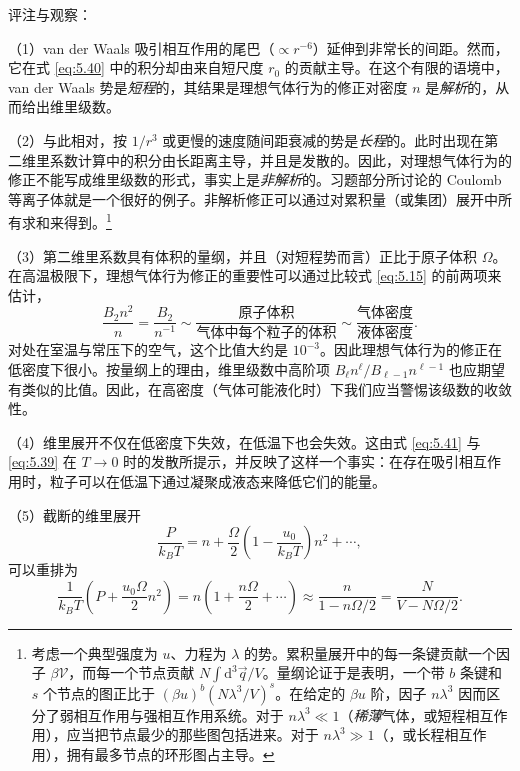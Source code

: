
评注与观察：

（1）van der Waals 吸引相互作用的尾巴（$\propto r^{-6}$）延伸到非常长的间距。然而，它在式 \eqref{eq:5.40} 中的积分却由来自短尺度 $r_0$ 的贡献主导。在这个有限的语境中，van der Waals 势是\emph{短程}的，其结果是理想气体行为的修正对密度 $n$ 是\emph{解析}的，从而给出维里级数。

（2）与此相对，按 $1/r^3$ 或更慢的速度随间距衰减的势是\emph{长程}的。此时出现在第二维里系数计算中的积分由长距离主导，并且是发散的。因此，对理想气体行为的修正不能写成维里级数的形式，事实上是\emph{非解析}的。习题部分所讨论的 Coulomb 等离子体就是一个很好的例子。非解析修正可以通过对累积量（或集团）展开中所有求和来得到。\footnote{考虑一个典型强度为 $u$、力程为 $\lambda$ 的势。累积量展开中的每一条键贡献一个因子 $\beta\mathscr V$，而每一个节点贡献 $N\int\mathrm{d}^3\vec q/V$。量纲论证于是表明，一个带 $b$ 条键和 $s$ 个节点的图正比于 $(\beta u)^b(N\lambda^3/V)^s$。在给定的 $\beta u$ 阶，因子 $n\lambda^3$ 因而区分了弱相互作用与强相互作用系统。对于 $n\lambda^3\ll1$（\emph{稀薄}气体，或短程相互作用），应当把节点最少的那些图包括进来。对于 $n\lambda^3\gg1$（，或长程相互作用），拥有最多节点的环形图占主导。}

（3）第二维里系数具有体积的量纲，并且（对短程势而言）正比于原子体积 $\Omega$。在高温极限下，理想气体行为修正的重要性可以通过比较式 \eqref{eq:5.15} 的前两项来估计，
\begin{equation}\label{eq:5.42}
\frac{B_2n^2}{n}=\frac{B_2}{n^{-1}}\sim\frac{\text{原子体积}}{\text{气体中每个粒子的体积}}\sim\frac{\text{气体密度}}{\text{液体密度}}.
\end{equation}
对处在室温与常压下的空气，这个比值大约是 $10^{-3}$。因此理想气体行为的修正在低密度下很小。按量纲上的理由，维里级数中高阶项 $B_\ell n^\ell/B_{\ell-1}n^{\ell-1}$ 也应期望有类似的比值。因此，在高密度（气体可能液化时）下我们应当警惕该级数的收敛性。

（4）维里展开不仅在低密度下失效，在低温下也会失效。这由式 \eqref{eq:5.41} 与 \eqref{eq:5.39} 在 $T\to0$ 时的发散所提示，并反映了这样一个事实：在存在吸引相互作用时，粒子可以在低温下通过凝聚成液态来降低它们的能量。

（5）截断的维里展开
\begin{equation}\label{eq:5.43}
\frac{P}{k_BT}=n+\frac{\Omega}{2}\left(1-\frac{u_0}{k_BT}\right)n^2+\cdots,
\end{equation}
可以重排为
\begin{equation}\label{eq:5.44}
\frac{1}{k_BT}\left(P+\frac{u_0\Omega}{2}n^2\right)=n\left(1+\frac{n\Omega}{2}+\cdots\right)\approx\frac{n}{1-n\Omega/2}=\frac{N}{V-N\Omega/2}.
\end{equation}


